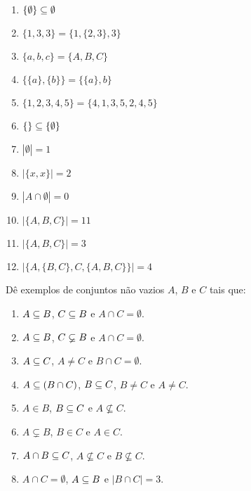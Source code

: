 \documentclass[12pt]{exam}
\begin{document}
\begin{multicols}{2}
\begin{enumerate}[label={\arabic*})]
            \item $\{\emptyset\} \subseteq \emptyset$

            \item $\{1, 3, 3\} = \{1, \{2, 3\}, 3\}$

            \item $\{a, b, c\} = \{A, B, C\}$

            \item $\{\{a\}, \{b\}\} = \{\{a\}, b\}$

            \item $\{1, 2, 3, 4, 5\} = \{4, 1, 3, 5, 2, 4, 5\}$

            \item $\{\} \subseteq \{\emptyset\}$

            \item $|\emptyset| = 1$

            \item $|\{x,x\}| = 2$

            \item $|A \cap \emptyset | = 0$

            \item $|\{A, B, C\}| = 11$

            \item $|\{A, B, C\}| = 3$

            \item $|\{A, \{B, C\}, C, \{A, B, C\}\}| = 4$

        \end{enumerate}
    \end{multicols}

    \questao{} D\^e exemplos de conjuntos n\~ao vazios $A$, $B$ e $C$ tais que:
    \begin{enumerate}[label={\alph*})]
        \item $A \subseteq B$, $C \subseteq B$ e $A \cap C = \emptyset$.

        \item $A \subseteq B$, $C \varsubsetneq B$ e $A \cap C = \emptyset$.

        \item $A \subseteq C$, $A \ne C$ e $B \cap C = \emptyset$.

        \item $A \subseteq (B \cap C)$, $B \subseteq C$, $B \ne C$ e $A \ne C$.

        \item $A \in B$, $B \subseteq C$ e $A \nsubseteq C$.

        \item $A \subsetneq B$, $B \in C$ e $A \in C$.

        \item $A \cap B \subseteq C$, $A \nsubseteq C$ e $B \nsubseteq C$.

        \item $A \cap C = \emptyset$, $A \subseteq B$ e $|B \cap C| = 3$.
    \end{enumerate}
\end{document}
